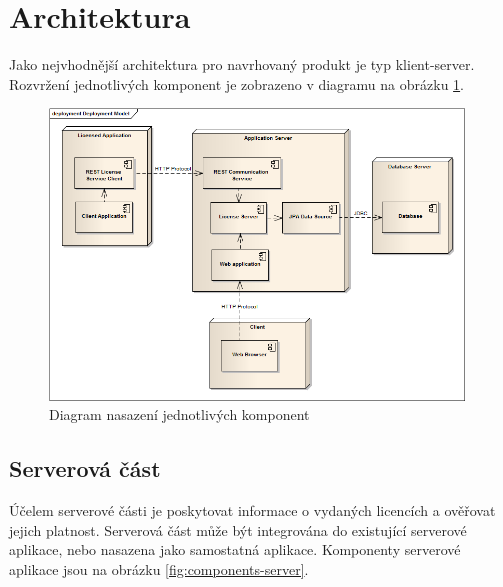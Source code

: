 \section{Architektura}

Jako nejvhodnější architektura pro navrhovaný produkt je typ klient-server.
Rozvržení jednotlivých komponent je zobrazeno v diagramu na obrázku
\ref{fig:deployment}.

\begin{figure}[tbh]
\begin{center}
\includegraphics[width=11cm]{figures/deployment.png}
\caption{Diagram nasazení jednotlivých komponent}
\label{fig:deployment} 
\end{center}
\end{figure}

\subsection{Serverová část}

Účelem serverové části je poskytovat informace o vydaných licencích a ověřovat
jejich platnost. Serverová část může být integrována do existující serverové
aplikace, nebo nasazena jako samostatná aplikace. Komponenty serverové aplikace
jsou na obrázku \ref{fig:components-server}.



